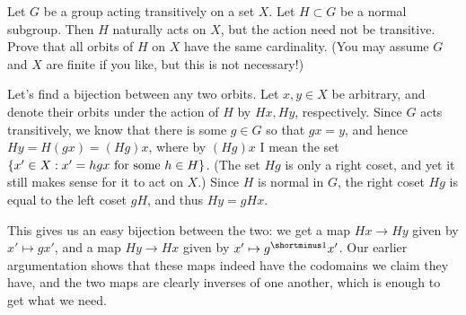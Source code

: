 %
\begin{question}[subtitle = January 2024 Problem 3,ID=Jan24_3]
Let $G$ be a group acting transitively on a set $X$. Let $H \subset G$ be a normal subgroup. Then $H$ naturally acts on $X$, but the action need not be transitive. Prove that all orbits of $H$ on $X$ have the same cardinality. (You may assume $G$ and $X$ are finite if you like, but this is not necessary!)
\end{question}
\begin{solution}
Let's find a bijection between any two orbits. Let $x, y \in X$ be arbitrary, and denote their orbits under the action of $H$ by $Hx, Hy$, respectively. Since $G$ acts transitively, we know that there is some $g \in G$ so that $gx = y$, and hence $Hy = H(gx) = (Hg)x$, where by $(Hg)x$ I mean the set $\{x' \in X: x' = hgx \text{ for some } h \in H\}$. (The set $Hg$ is only a right coset, and yet it still makes sense for it to act on $X$.) Since $H$ is normal in $G$, the right coset $Hg$ is equal to the left coset $gH$, and thus $Hy = gHx$.

This gives us an easy bijection between the two: we get a map $Hx \to Hy$ given by $x' \mapsto gx'$, and a map $Hy \to Hx$ given by $x' \mapsto g\inv x'$. Our earlier argumentation shows that these maps indeed have the codomains we claim they have, and the two maps are clearly inverses of one another, which is enough to get what we need.
\end{solution}


